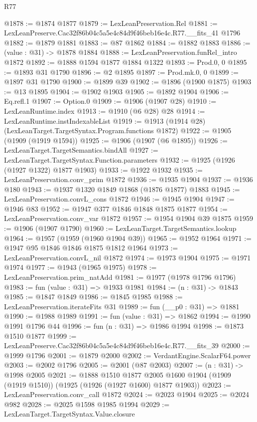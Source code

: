 \begin{lexlean}{R77}
\begin{coremodule}
@1878 := @1874 @1877
@1879 := LexLeanPreservation.Rel
@1881 := LexLeanPreserve.Cac32f86b04c5a5e4c84d9f46beb16e4c.R77.__fits_41 @1796
@1882 := @1879 @1881
@1883 := @87 @1862
@1884 := @1882 @1883
@1886 := (value : @31) -> @1878 @1884
@1888 := LexLeanPreservation.funRel_intro @1872
@1892 := @1888 @1594 @1877 @1884 @1322
@1893 := Prod.{0, 0}
@1895 := @1893 @31 @1790
@1896 := @2 @1895
@1897 := Prod.mk.{0, 0}
@1899 := @1897 @31 @1790
@1900 := @1899 @39
@1902 := @1896 (@1900 @1875)
@1903 := @13 @1895
@1904 := @1902 @1903
@1905 := @1892 @1904
@1906 := Eq.refl.{1}
@1907 := Option.{0}
@1909 := @1906 (@1907 @28)
@1910 := LexLeanRuntime.index
@1913 := @1910 (@6 @28) @28
@1914 := LexLeanRuntime.instIndexableList
@1919 := @1913 (@1914 @28) (LexLeanTarget.TargetSyntax.Program.functions @1872)
@1922 := @1905 (@1909 (@1919 @1594))
@1925 := @1906 (@1907 (@6 @1895))
@1926 := LexLeanTarget.TargetSemantics.bindAll
@1927 := LexLeanTarget.TargetSyntax.Function.parameters
@1932 := @1925 (@1926 (@1927 @1322) @1877 @1903)
@1933 := @1922 @1932
@1935 := LexLeanPreservation.conv_prim @1872
@1936 := @1935 @1904
@1937 := @1936 @180
@1943 := @1937 @1320 @1849 @1868 (@1876 @1877) @1883
@1945 := LexLeanPreservation.convL_cons @1872
@1946 := @1945 @1904
@1947 := @1946 @83
@1952 := @1947 @377 @1846 @1848 @1875 @1877
@1954 := LexLeanPreservation.conv_var @1872
@1957 := @1954 @1904 @39 @1875
@1959 := @1906 (@1907 @1790)
@1960 := LexLeanTarget.TargetSemantics.lookup
@1964 := @1957 (@1959 (@1960 @1904 @39))
@1965 := @1952 @1964
@1971 := @1947 @95 @1846 @1846 @1875 @1812 @1964
@1973 := LexLeanPreservation.convL_nil @1872
@1974 := @1973 @1904
@1975 := @1971 @1974
@1977 := @1943 (@1965 @1975)
@1978 := LexLeanPreservation.prim_natAdd
@1981 := @1977 (@1978 @1796 @1796)
@1983 := fun (value : @31) => @1933 @1981
@1984 := (n : @31) -> @1843
@1985 := @1847 @1849
@1986 := @1845 @1985
@1988 := LexLeanPreservation.iterateFits @31
@1989 := fun (__p0 : @31) => @1881
@1990 := @1988 @1989
@1991 := fun (value : @31) => @1862
@1994 := @1990 @1991 @1796 @44
@1996 := fun (n : @31) => @1986 @1994
@1998 := @1873 @1510 @1877
@1999 := LexLeanPreserve.Cac32f86b04c5a5e4c84d9f46beb16e4c.R77.__fits_39
@2000 := @1999 @1796
@2001 := @1879 @2000
@2002 := VerdantEngine.ScalarF64.power
@2003 := @2002 @1796
@2005 := @2001 (@87 @2003)
@2007 := (n : @31) -> @1998 @2005
@2021 := @1888
    @1510
    @1877
    @2005
    @1600
    @1904
    (@1909 (@1919 @1510))
    (@1925 (@1926 (@1927 @1600) @1877 @1903))
@2023 := LexLeanPreservation.conv_call @1872
@2024 := @2023 @1904
@2025 := @2024 @982
@2028 := @2025 @1598 @1985 @1994
@2029 := LexLeanTarget.TargetSyntax.Value.closure

\end{coremodule}
\end{lexlean}
